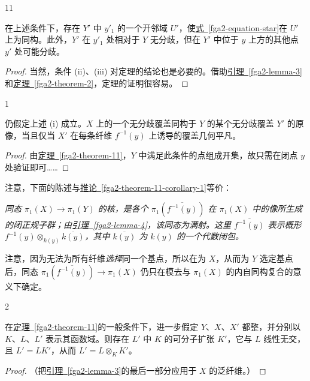 \begin{theorem}{11}\label{fga2-theorem-11}\skipsinglepar
\par{}在上述条件下，存在 \(Y'\) 中 \(y'_1\) 的一个开邻域 \(U'\)，使\hyperref[fga2-equation-star]{式~\ref*{fga2-equation-star}}在 \(U'\) 上为同构。此外，\(Y'\) 在 \(y'_1\) 处相对于 \(Y\) 无分歧，但在 \(Y'\) 中位于 \(y\) 上方的其他点 \(y'\) 处可能分歧。
\begin{proof}
\par{}当然，条件 (ii)、(iii) 对定理的结论也是必要的。借助\hyperref[fga2-lemma-3]{引理~\ref*{fga2-lemma-3}}和\hyperref[fga2-theorem-2]{定理~\ref*{fga2-theorem-2}}，定理的证明很容易。\end{proof}\end{theorem}
\begin{corollary}{1}\label{fga2-theorem-11-corollary-1}\skipsinglepar
\par{}仍假定上述 (i) 成立。\(X\) 上的一个无分歧覆盖同构于 \(Y\) 的某个无分歧覆盖 \(Y'\) 的原像，当且仅当 \(X'\) 在每条纤维 \(f^{-1}(y)\) 上诱导的覆盖几何平凡。
\begin{proof}
\par{}由\hyperref[fga2-theorem-11]{定理~\ref*{fga2-theorem-11}}，\(Y\) 中满足此条件的点组成开集，故只需在闭点 \(y\) 处验证即可……\end{proof}\end{corollary}
\par{}注意，下面的陈述与\hyperref[fga2-theorem-11-corollary-1]{推论~\ref*{fga2-theorem-11-corollary-1}}等价：
\par{}\emph{同态 \(\pi _1(X)\to \pi _1(Y)\) 的核，是各个 \(\pi _1(\overline {f^{-1}(y)})\) 在 \(\pi _1(X)\) 中的像所生成的闭正规子群；由\hyperref[fga2-lemma-4]{引理~\ref*{fga2-lemma-4}}，该同态为满射。这里 \(\overline {f^{-1}(y)}\) 表示概形 \(f^{-1}(y)\otimes _{k(y)}\overline {k(y)}\)，其中 \(\overline {k(y)}\) 为 \(k(y)\) 的一个代数闭包。}
\par{}注意，因为无法为所有纤维\emph{选择}同一个基点，所以在为 \(X\)，从而为 \(Y\) 选定基点后，同态 \(\pi _1(\overline {f^{-1}(y)})\to \pi _1(X)\) 仍只在模去与 \(\pi _1(X)\) 的内自同构复合的意义下确定。
\begin{corollary}{2}\label{fga2-theorem-11-corollary-2}\skipsinglepar
\par{}在\hyperref[fga2-theorem-11]{定理~\ref*{fga2-theorem-11}}的一般条件下，进一步假定 \(Y\)、\(X\)、\(X'\) 都整，并分别以 \(K\)、\(L\)、\(L'\) 表示其函数域。则存在 \(L'\) 中 \(K\) 的可分子扩张 \(K'\)，它与 \(L\) 线性无交，且 \(L'=LK'\)，从而 \(L'=L\otimes _KK'\)。
\begin{proof}
\par{}（把\hyperref[fga2-lemma-3]{引理~\ref*{fga2-lemma-3}}的最后一部分应用于 \(X\) 的泛纤维。）\end{proof}\end{corollary}
